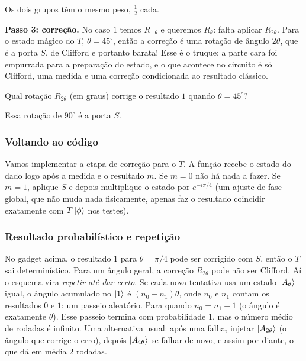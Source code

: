 Os dois grupos têm o mesmo peso, \(\tfrac12\) cada.

\textbf{Passo 3: correção.} No caso \(1\) temos \(R_{-\theta}\) e queremos \(R_{\theta}\): falta aplicar \(R_{2\theta}\). Para o estado mágico do \(T\), \(\theta = 45^\circ\), então a correção é uma rotação de ângulo \(2\theta\), que é a porta \(S\), de Clifford e portanto barata! Esse é o truque: a parte cara foi empurrada para a preparação do estado, e o que acontece no circuito é só Clifford, uma medida e uma correção condicionada ao resultado clássico.

Qual rotação \(R_{2\theta}\) (em graus) corrige o resultado \(1\) quando \(\theta = 45^\circ\)?

Essa rotação de \(90^\circ\) é a porta \(S\).

\subsubsection{Voltando ao código}\label{voltando-ao-cuxf3digo}

Vamos implementar a etapa de correção para o \(T\). A função recebe o estado do dado logo após a medida e o resultado \(m\). Se \(m=0\) não há nada a fazer. Se \(m=1\), aplique \(S\) e depois multiplique o estado por \(e^{-i\pi/4}\) (um ajuste de fase global, que não muda nada fisicamente, apenas faz o resultado coincidir exatamente com \(T\left|{\phi}\right>\) nos testes).

\subsubsection{Resultado probabilístico e repetição}\label{resultado-probabiluxedstico-e-repetiuxe7uxe3o}

No gadget acima, o resultado \(1\) para \(\theta=\pi/4\) pode ser corrigido com \(S\), então o \(T\) sai determinístico. Para um ângulo geral, a correção \(R_{2\theta}\) pode não ser Clifford. Aí o esquema vira \emph{repetir até dar certo}. Se cada nova tentativa usa um estado \(\left|{A_\theta}\right>\) igual, o ângulo acumulado no \(\left|{1}\right>\) é \((n_0-n_1)\theta\), onde \(n_0\) e \(n_1\) contam os resultados \(0\) e \(1\): um passeio aleatório. Para quando \(n_0=n_1+1\) (o ângulo é exatamente \(\theta\)). Esse passeio termina com probabilidade \(1\), mas o número médio de rodadas é infinito. Uma alternativa usual: após uma falha, injetar \(\left|{A_{2\theta}}\right>\) (o ângulo que corrige o erro), depois \(\left|{A_{4\theta}}\right>\) se falhar de novo, e assim por diante, o que dá em média 2 rodadas.

